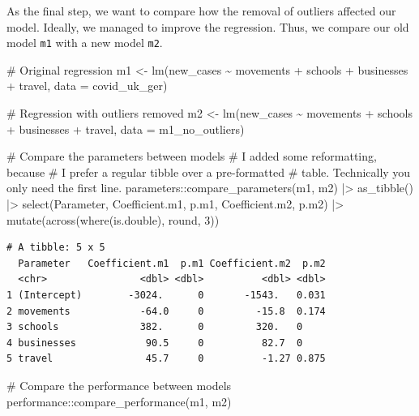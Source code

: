 \documentclass[
  letterpaper,
]{krantz}
\makeatletter
\newenvironment{Shaded}{\begin{snugshade}}{\end{snugshade}}
\newcommand{\AttributeTok}[1]{\textcolor[rgb]{0.40,0.45,0.13}{#1}}
\newcommand{\CommentTok}[1]{\textcolor[rgb]{0.37,0.37,0.37}{#1}}
\newcommand{\DecValTok}[1]{\textcolor[rgb]{0.68,0.00,0.00}{#1}}
\newcommand{\FunctionTok}[1]{\textcolor[rgb]{0.28,0.35,0.67}{#1}}
\newcommand{\NormalTok}[1]{\textcolor[rgb]{0.00,0.23,0.31}{#1}}
\newcommand{\OtherTok}[1]{\textcolor[rgb]{0.00,0.23,0.31}{#1}}
\newcommand{\SpecialCharTok}[1]{\textcolor[rgb]{0.37,0.37,0.37}{#1}}
\newenvironment{kframe}{%
\medskip{}
\setlength{\fboxsep}{.8em}
 \def\at@end@of@kframe{}%
 \ifinner\ifhmode%
  \def\at@end@of@kframe{\end{minipage}}%
  \begin{minipage}{\columnwidth}%
 \fi\fi%
 \def\FrameCommand##1{\hskip\@totalleftmargin \hskip-\fboxsep
 \colorbox{shadecolor}{##1}\hskip-\fboxsep
     \hskip-\linewidth \hskip-\@totalleftmargin \hskip\columnwidth}%
 \MakeFramed {\advance\hsize-\width
   \@totalleftmargin\z@ \linewidth\hsize
   \@setminipage}}%
 {\par\unskip\endMakeFramed%
 \at@end@of@kframe}
\renewenvironment{Shaded}{\begin{kframe}}{\end{kframe}}
\makeatother
\begin{document}
As the final step, we want to compare how the removal of outliers
affected our model. Ideally, we managed to improve the regression. Thus,
we compare our old model \texttt{m1} with a new model \texttt{m2}.

\begin{Shaded}
\begin{Highlighting}[]
\CommentTok{\# Original regression}
\NormalTok{m1 }\OtherTok{\textless{}{-}} \FunctionTok{lm}\NormalTok{(new\_cases }\SpecialCharTok{\textasciitilde{}}\NormalTok{ movements }\SpecialCharTok{+}\NormalTok{ schools }\SpecialCharTok{+}\NormalTok{ businesses }\SpecialCharTok{+}\NormalTok{ travel,}
         \AttributeTok{data =}\NormalTok{ covid\_uk\_ger)}

\CommentTok{\# Regression with outliers removed}
\NormalTok{m2 }\OtherTok{\textless{}{-}} \FunctionTok{lm}\NormalTok{(new\_cases }\SpecialCharTok{\textasciitilde{}}\NormalTok{ movements }\SpecialCharTok{+}\NormalTok{ schools }\SpecialCharTok{+}\NormalTok{ businesses }\SpecialCharTok{+}\NormalTok{ travel,}
         \AttributeTok{data =}\NormalTok{ m1\_no\_outliers)}

\CommentTok{\# Compare the parameters between models}
\CommentTok{\# I added some reformatting, because}
\CommentTok{\# I prefer a regular tibble over a pre{-}formatted}
\CommentTok{\# table. Technically you only need the first line.}
\NormalTok{parameters}\SpecialCharTok{::}\FunctionTok{compare\_parameters}\NormalTok{(m1, m2) }\SpecialCharTok{|\textgreater{}}
  \FunctionTok{as\_tibble}\NormalTok{() }\SpecialCharTok{|\textgreater{}}
  \FunctionTok{select}\NormalTok{(Parameter, Coefficient.m1, p.m1, Coefficient.m2, p.m2) }\SpecialCharTok{|\textgreater{}}
  \FunctionTok{mutate}\NormalTok{(}\FunctionTok{across}\NormalTok{(}\FunctionTok{where}\NormalTok{(is.double), round, }\DecValTok{3}\NormalTok{))}
\end{Highlighting}
\end{Shaded}

\begin{verbatim}
# A tibble: 5 x 5
  Parameter   Coefficient.m1  p.m1 Coefficient.m2  p.m2
  <chr>                <dbl> <dbl>          <dbl> <dbl>
1 (Intercept)        -3024.      0       -1543.   0.031
2 movements            -64.0     0         -15.8  0.174
3 schools              382.      0         320.   0    
4 businesses            90.5     0          82.7  0    
5 travel                45.7     0          -1.27 0.875
\end{verbatim}

\begin{Shaded}
\begin{Highlighting}[]
\CommentTok{\# Compare the performance between models}
\NormalTok{performance}\SpecialCharTok{::}\FunctionTok{compare\_performance}\NormalTok{(m1, m2)}
\end{Highlighting}
\end{Shaded}
\end{document}
